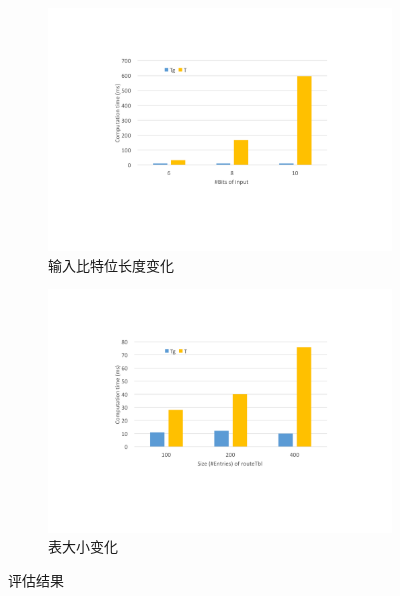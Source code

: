 \begin{figure}
  \centering

  \begin{subfigure}[b]{0.45\textwidth}
      \includegraphics[width=\textwidth]{figures/figure-eval-t1.pdf}
      \caption{输入比特位长度变化}
      \label{cap:fig:eval-ct:a}
  \end{subfigure}
  \begin{subfigure}[b]{0.45\textwidth}
      \includegraphics[width=\textwidth]{figures/figure-eval-t2.pdf}
      \caption{表大小变化}  %
      \label{cap:fig:eval-ct:b}
  \end{subfigure}
  \caption{评估结果}  %
  \label{cap:fig:eval-ct}
\end{figure}




